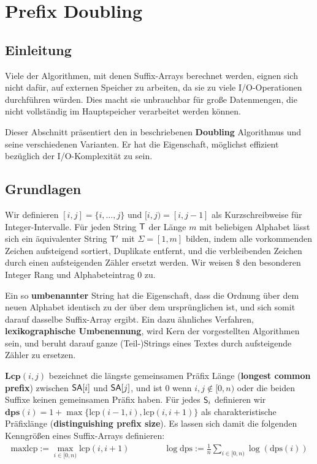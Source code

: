 \section{Prefix Doubling}

\subsection{Einleitung}

Viele  der Algorithmen, mit denen Suffix-Arrays berechnet werden, eignen sich nicht dafür, auf externen Speicher zu arbeiten, da sie zu viele I/O-Operationen durchführen würden. Dies macht sie unbrauchbar für große Datenmengen, die nicht vollständig im Hauptspeicher verarbeitet werden können.

Dieser Abschnitt präsentiert den in \cite{saca:11} beschriebenen \textbf{Doubling} Algorithmus und seine verschiedenen Varianten. Er hat die Eigenschaft, möglichst effizient bezüglich der I/O-Komplexität zu sein.

\subsection{Grundlagen}

Wir definieren $[i, j] = \{i, \dots, j\}$ und $[i, j) = [i, j - 1]$ als Kurzschreibweise für Integer-Intervalle. Für jeden String $\inputtext$ der Länge $m$ mit beliebigen Alphabet lässt sich ein äquivalenter String $\inputtext'$ mit $\Sigma = [1, m]$ bilden, indem alle vorkommenden Zeichen aufsteigend sortiert, Duplikate entfernt, und die verbleibenden Zeichen durch einen aufsteigenden Zähler ersetzt werden. Wir weisen $\$$ den besonderen Integer Rang und Alphabeteintrag $0$ zu.

Ein so \textbf{umbenannter} String hat die Eigenschaft, dass die Ordnung über dem neuen Alphabet identisch zu der über dem ursprünglichen ist, und sich somit darauf dasselbe Suffix-Array ergibt. Ein dazu ähnliches Verfahren, \textbf{lexikographische Umbenennung}, wird Kern der vorgestellten Algorithmen sein, und beruht darauf ganze (Teil-)Strings eines Textes durch aufsteigende Zähler zu ersetzen.

$\textbf{Lcp}(i, j)$ bezeichnet die längste gemeinsamen Präfix Länge (\textbf{longest common prefix}) zwischen $\sa[i]$ und $\sa[j]$, und ist $0$ wenn $i, j \notin [0, n)$ oder die beiden Suffixe keinen gemeinsamen Präfix haben. Für jedes $\mathsf{S}_{i}$ definieren wir $\textbf{dps}(i) = 1 + \max\{\text{lcp}(i - 1, i), \text{lcp}(i, i + 1)\}$ als charakteristische Präfixlänge (\textbf{distinguishing prefix size}). Es lassen sich damit die folgenden Kenngrößen eines Suffix-Arrays definieren:
\begin{gather*}
\text{maxlcp} := \max_{i \in [0, n)} \text{lcp}(i, i + 1) 
\qquad\qquad
\log \text{dps} := \frac{1}{n} \sum_{i \in [0, n)} \log(\text{dps}(i))
\end{gather*}

